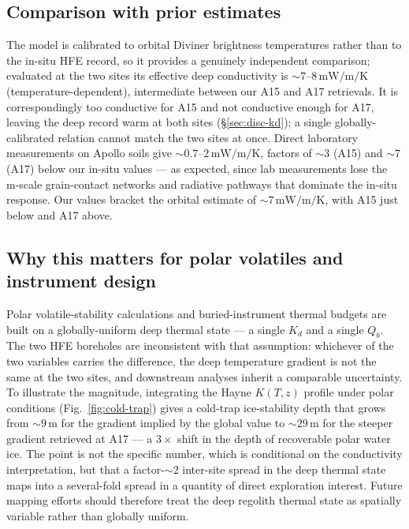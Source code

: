 \documentclass[11pt]{article}
\begin{document}
\subsection{Comparison with prior estimates}
The \citet{martinez2021} model is calibrated to orbital Diviner
brightness temperatures rather than to the in-situ HFE record, so it
provides a genuinely independent comparison; evaluated at the two
sites its effective deep conductivity is
$\sim\!7$--$8\,\si{\milli\watt\per\meter\per\kelvin}$
(temperature-dependent), intermediate between our A15 and A17
retrievals. It is correspondingly too conductive for A15 and not
conductive enough for A17, leaving the deep record warm at both sites
(\S\ref{sec:disc-kd}); a single globally-calibrated relation cannot
match the two sites at once. Direct laboratory measurements on
Apollo soils \citep{cremers1971,horai1981,hemingway1973} give
$\sim\!0.7$--$2\,\si{\milli\watt\per\meter\per\kelvin}$, factors of
$\sim\!3$ (A15) and $\sim\!7$ (A17) below our in-situ values --- as
expected, since lab measurements lose the m-scale grain-contact
networks and radiative pathways that dominate the in-situ response.
Our values bracket the orbital \citet{vasavada2012} estimate of
$\sim\!7\,\si{\milli\watt\per\meter\per\kelvin}$, with A15 just below
and A17 above.

\subsection{Why this matters for polar volatiles and instrument
design}
Polar volatile-stability calculations and buried-instrument thermal
budgets are built on a globally-uniform deep thermal state --- a
single $K_d$ and a single $Q_b$. The two HFE boreholes are
inconsistent with that assumption: whichever of the two variables
carries the difference, the deep temperature gradient is not the same
at the two sites, and downstream analyses inherit a comparable
uncertainty. To illustrate the magnitude, integrating the Hayne
$K(T,z)$ profile under polar conditions (Fig.~\ref{fig:cold-trap})
gives a cold-trap ice-stability depth that grows from
$\sim\!9\,\mathrm{m}$ for the gradient implied by the
\citet{hayne2017} global value to $\sim\!29\,\mathrm{m}$ for the
steeper gradient retrieved at A17 --- a $3\times$ shift in the depth
of recoverable polar water ice. The point is not the specific number,
which is conditional on the conductivity interpretation, but that a
factor-$\sim\!2$ inter-site spread in the deep thermal state maps into
a several-fold spread in a quantity of direct exploration interest.
Future mapping efforts should therefore treat the deep regolith
thermal state as spatially variable rather than globally uniform.
\end{document}
